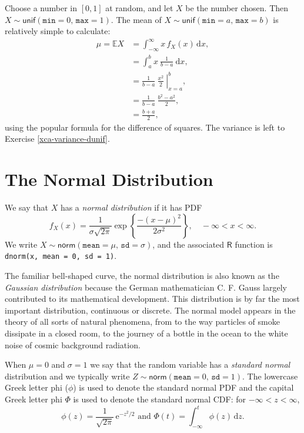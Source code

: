 Choose a number in \( [0,1] \) at random, and let \(X\) be the number
chosen. Then \(X\sim\mathsf{unif}(\mathtt{min}=0,\,\mathtt{max}=1)\).
The mean of \(X\sim\mathsf{unif}(\mathtt{min}=a,\,\mathtt{max}=b)\) is
relatively simple to calculate:
\begin{align*}
\mu=\mathbb{E} X & =\int_{-\infty}^{\infty}x\, f_{X}(x)\,\mathrm{d} x,\\
 & =\int_{a}^{b}x\ \frac{1}{b-a}\ \mathrm{d} x,\\
 & =\left.\frac{1}{b-a}\ \frac{x^{2}}{2}\ \right|_{x=a}^{b},\\
 & =\frac{1}{b-a}\ \frac{b^{2}-a^{2}}{2},\\
 & =\frac{b+a}{2},
\end{align*}
using the popular formula for the difference of squares. The variance
is left to Exercise \ref{xca-variance-dunif}.

\section{The Normal Distribution}
\label{sec-6-3}

We say that \(X\) has a \emph{normal distribution} if it has PDF
\begin{equation}
f_{X}(x)=\frac{1}{\sigma\sqrt{2\pi}}\exp \left\{ \frac{-(x-\mu)^{2}}{2\sigma^{2}} \right\},\quad -\infty < x < \infty.
\end{equation}
We write
\(X\sim\mathsf{norm}(\mathtt{mean}=\mu,\,\mathtt{sd}=\sigma)\), and
the associated \(\mathsf{R}\) function is \texttt{dnorm(x, mean = 0, sd =
1)}.

The familiar bell-shaped curve, the normal distribution is also known
as the \emph{Gaussian distribution} because the German mathematician
C. F. Gauss largely contributed to its mathematical development. This
distribution is by far the most important distribution, continuous or
discrete. The normal model appears in the theory of all sorts of
natural phenomena, from to the way particles of smoke dissipate in a
closed room, to the journey of a bottle in the ocean to the white
noise of cosmic background radiation.

When \(\mu=0\) and \(\sigma=1\) we say that the random variable has a
\emph{standard normal} distribution and we typically write
\(Z\sim\mathsf{norm}(\mathtt{mean}=0,\,\mathtt{sd}=1)\). The lowercase
Greek letter phi (\(\phi\)) is used to denote the standard normal PDF
and the capital Greek letter phi \(\Phi\) is used to denote the
standard normal CDF: for \(-\infty<z<\infty\),
\begin{equation}
\phi(z)=\frac{1}{\sqrt{2\pi}}\,\mathrm{e}^{-z^{2}/2}\mbox{ and }\Phi(t)=\int_{-\infty}^{t}\phi(z)\,\mathrm{d} z.
\end{equation}

